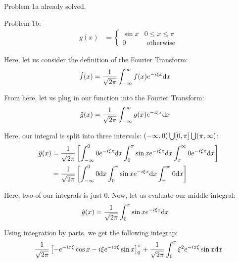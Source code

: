 Problem 1a already solved.

\bigbreak

Problem 1b:
%
\begin{align}
  g(x) & =
  \begin{cases}
    \sin x & 0 \leq x \leq \pi\\
    0 & \text{ otherwise}
  \end{cases}
\end{align}

Here, let us consider the definition of the Fourier Transform:
%
\begin{align}
  \hat f(x) & = \frac{1}{\sqrt{2 \pi}} \int^\infty_{-\infty} f(x) e^{-i \xi x} \text dx
\end{align}

From here, let us plug in our function into the Fourier Transform:
%
\begin{align}
  \hat g(x) & = \frac{1}{\sqrt{2 \pi}} \int^\infty_{-\infty} g(x) e^{-i \xi x} \text dx
\end{align}

Here, our integral is split into three intervals: $(-\infty, 0) \bigcup [0, \pi] \bigcup (\pi, \infty)$:
%
\begin{align}
  \hat g(x)
  & = \frac{1}{\sqrt{2 \pi}} \left[
  \int^{0}_{-\infty}  0 e^{-i \xi x} \text dx
  \int^{\pi}_{0}      \sin x e^{-i \xi x} \text dx
  \int^{\infty}_{\pi} 0 e^{-i \xi x} \text dx
  \right]\\
  & = \frac{1}{\sqrt{2 \pi}} \left[
  \int^{0}_{-\infty}  0 \text dx
  \int^{\pi}_{0}      \sin x e^{-i \xi x} \text dx
  \int^{\infty}_{\pi} 0 \text dx
  \right]
\end{align}

Here, two of our integrals is just $0$. Now, let us evaluate our middle integral:
%
\begin{align}
  \hat g(x) & = \frac{1}{\sqrt{2 \pi}} \int^\pi_0 \sin x e^{-i \xi x} \text dx
\end{align}

Using integration by parts, we get the following integrap:
%
\begin{align}
  \frac{1}{\sqrt{2 \pi}} \left[ - e^{-i x \xi} \cos x - i \xi e^{-i x \xi} \sin x \right]^\pi_0 + \frac{1}{\sqrt{2 \pi}}\int^\pi_0 \xi^2 e^{-i x \xi} \sin x \text dx
\end{align}
